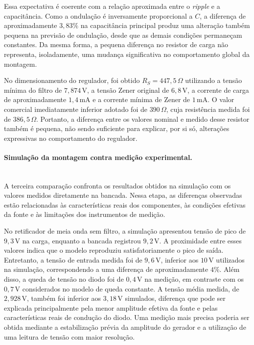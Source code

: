 \documentclass[11pt,a4paper]{article}
\begin{document}
Essa expectativa é coerente com a relação aproximada entre o \textit{ripple} e a capacitância. Como a ondulação é inversamente proporcional a $C$, a diferença de aproximadamente $3{,}83\%$ na capacitância principal produz uma alteração também pequena na previsão de ondulação, desde que as demais condições permaneçam constantes. Da mesma forma, a pequena diferença no resistor de carga não representa, isoladamente, uma mudança significativa no comportamento global da montagem.

No dimensionamento do regulador, foi obtido $R_S=447{,}5\,\Omega$ utilizando a tensão mínima do filtro de $7{,}874\,\text{V}$, a tensão Zener original de $6{,}8\,\text{V}$, a corrente de carga de aproximadamente $1{,}4\,\text{mA}$ e a corrente mínima de Zener de $1\,\text{mA}$. O valor comercial imediatamente inferior adotado foi de $390\,\Omega$, cuja resistência medida foi de $386{,}5\,\Omega$. Portanto, a diferença entre os valores nominal e medido desse resistor também é pequena, não sendo suficiente para explicar, por si só, alterações expressivas no comportamento do regulador.

\paragraph{Simulação da montagem contra medição experimental.}\mbox{}\\

A terceira comparação confronta os resultados obtidos na simulação com os valores medidos diretamente na bancada. Nessa etapa, as diferenças observadas estão relacionadas às características reais dos componentes, às condições efetivas da fonte e às limitações dos instrumentos de medição.

No retificador de meia onda sem filtro, a simulação apresentou tensão de pico de $9{,}3\,\text{V}$ na carga, enquanto a bancada registrou $9{,}2\,\text{V}$. A proximidade entre esses valores indica que o modelo reproduziu satisfatoriamente o pico de saída. Entretanto, a tensão de entrada medida foi de $9{,}6\,\text{V}$, inferior aos $10\,\text{V}$ utilizados na simulação, correspondendo a uma diferença de aproximadamente $4\%$. Além disso, a queda de tensão no diodo foi de $0{,}4\,\text{V}$ na medição, em contraste com os $0{,}7\,\text{V}$ considerados no modelo de queda constante. A tensão média medida, de $2{,}928\,\text{V}$, também foi inferior aos $3{,}18\,\text{V}$ simulados, diferença que pode ser explicada principalmente pela menor amplitude efetiva da fonte e pelas características reais de condução do diodo. Uma medição mais precisa poderia ser obtida mediante a estabilização prévia da amplitude do gerador e a utilização de uma leitura de tensão com maior resolução.
\end{document}
